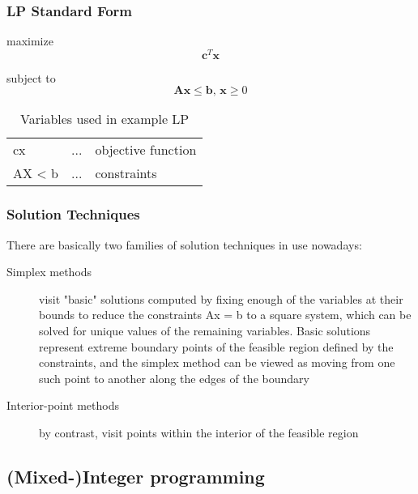 \subsubsection{LP Standard Form}
\label{sec:LPStandardForm}

maximize \[ \mathbf{c}^T \mathbf{x} \]

subject to \[ \mathbf{A}\mathbf{x} \le \mathbf{b}, \, \mathbf{x} \ge 0 \]


\begin{table}[htbp] 
\begin{tabular}{||l|l|l||} \hline\hline
	
	cx			&...&	objective function\\
	AX < b	&...&	constraints\\	\hline\hline

\end{tabular} 
\caption{Variables used in example LP}
\end{table}

\subsubsection{Solution Techniques}
\label{sec:SolutionTechniques}

There are basically two families of solution techniques in use nowadays:

\begin{description}

	\item[Simplex methods] visit "basic" solutions computed by fixing enough of the variables at their bounds to reduce the constraints Ax = b to a square system, which can be solved for unique values of the remaining variables.
	Basic solutions represent extreme boundary points of the feasible region defined by the constraints, and the simplex method can be viewed as moving from one such point to another along the edges of the boundary
	\item[Interior-point methods] by contrast, visit points within the interior of the feasible region
	
\end{description}

\subsection{(Mixed-)Integer programming}
\label{sec:IntegerProgramming}

